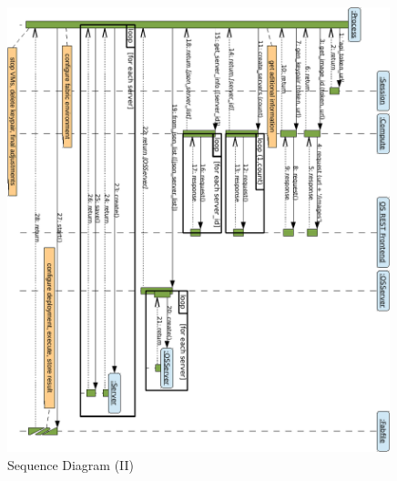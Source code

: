 \begin{figure}[tbp]
\begin{center}
\includegraphics[width=0.99\textwidth]{imagenes/034.pdf}
 \caption{Sequence Diagram (II)}
\label{fig:secuencia2}
\end{center}
\end{figure}
